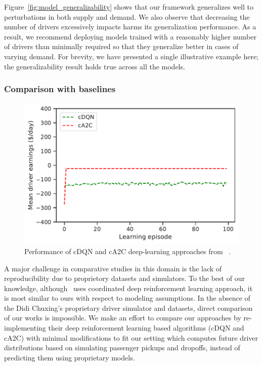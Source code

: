 Figure~\ref{fig:model_generalizability} shows that our framework
    generalizes well to perturbations in both supply and demand. 
We also observe that decreasing the number of drivers excessively 
    impacts harms its generalization performance. 
As a result, we recommend deploying models trained with a reasonably higher 
    number of drivers than minimally required so that they generalize better in 
    cases of varying demand. %
For brevity, we have presented a single illustrative example here; 
    the generalizability result holds true across all the models.

\subsubsection{Comparison with baselines}
\label{sec:comparative_baselines}
\begin{figure}
	\centering
	\includegraphics[scale=0.36]{figures/comparative_baselines.pdf}
    \caption{Performance of cDQN and cA2C deep-learning approaches from ~\cite{Lin2018-vs}.} 
	\label{fig:comparative_baselines}
\end{figure}
A major challenge in comparative studies in this domain is the
    lack of reproducibility due to proprietory datasets and
    simulators.
To the best of our knowledge, although~\cite{Lin2018-vs} uses coordinated deep
    reinforcement learning approach, it is most similar to 
    ours with respect to modeling assumptions. 
In the absence of the  Didi Chuxing's proprietary driver 
    simulator and datasets, direct comparison of our works is impossible. 
We make an effort to compare our approaches by re-implementing their deep 
    reinforcement learning based algorithms (cDQN and cA2C) with minimal 
    modifications to fit 
    our setting which computes future driver distributions based on simulating
    passenger pickups and dropoffs, instead of predicting them using proprietary
    models.
    
